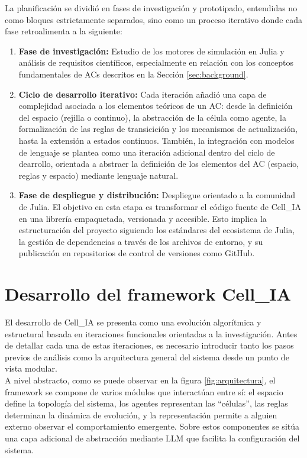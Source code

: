 \documentclass[runningheads]{llncs}
\begin{document}
La planificación se dividió en fases de investigación y prototipado, entendidas no como bloques estrictamente separados, sino como un proceso iterativo donde cada fase retroalimenta a la siguiente:
\begin{enumerate}
    \item \textbf{Fase de investigación:} Estudio de los motores de simulación en Julia y análisis de requisitos científicos, especialmente en relación con los conceptos fundamentales de ACs descritos en la Sección \ref{sec:background}.
    \item \textbf{Ciclo de desarrollo iterativo:} Cada iteración añadió una capa de complejidad asociada a los elementos teóricos de un AC: desde la definición del espacio (rejilla o continuo), la abstracción de la célula como agente, la formalización de las reglas de transicición y los mecanismos de actualización, hasta la extensión a estados continuos. También, la integración con modelos de lenguaje se plantea como una iteración adicional dentro del ciclo de dearrollo, orientada a abstraer la definición de los elementos del AC (espacio, reglas y espacio) mediante lenguaje natural.
    \item \textbf{Fase de despliegue y distribución:} Despliegue orientado a la comunidad de Julia. El objetivo en esta etapa es transformar el código fuente de Cell\_IA en una librería empaquetada, versionada y accesible. Esto implica la estructuración del proyecto siguiendo los estándares del ecosistema de Julia, la gestión de dependencias a través de los archivos de entorno, y su publicación en repositorios de control de versiones como GitHub.
\end{enumerate}

\section{Desarrollo del framework Cell\_IA}
\label{sec:desarrollo}

El desarrollo de Cell\_IA se presenta como una evolución algorítmica y estructural basada en iteraciones funcionales orientadas a la investigación. Antes de detallar cada una de estas iteraciones, es necesario introducir tanto los pasos previos de análisis como la arquitectura general del sistema desde un punto de vista modular.\\

A nivel abstracto, como se puede observar en la figura \ref{fig:arquitectura}, el framework se compone de varios módulos que interactúan entre sí: el espacio define la topología del sistema, los agentes representan las ``células'', las reglas determinan la dinámica de evolución, y la representación permite a alguien externo observar el comportamiento emergente. Sobre estos componentes se sitúa una capa adicional de abstracción mediante LLM que facilita la configuración del sistema.
\end{document}
